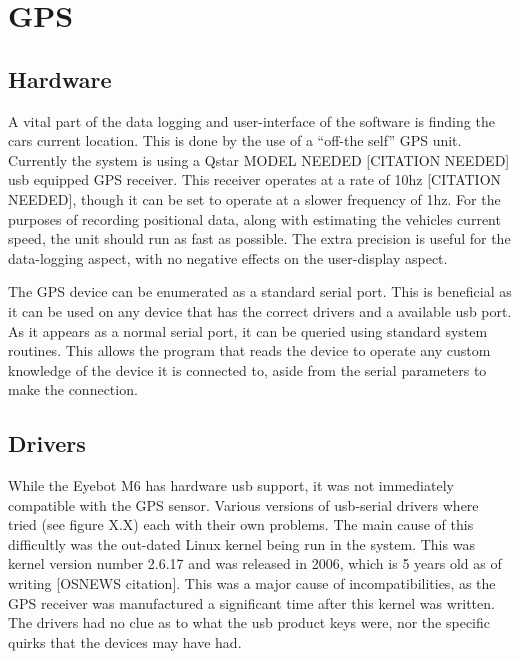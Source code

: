 

\section{GPS}

\subsection{Hardware}

A vital part of the data logging and user-interface of the software is finding the cars current location. This is done by the use of a “off-the self” GPS unit. Currently the system is using a Qstar MODEL NEEDED [CITATION NEEDED] usb equipped GPS receiver. This receiver operates at a rate of 10hz [CITATION NEEDED], though it can be set to operate at a slower frequency of 1hz. For the purposes of recording positional data, along with estimating the vehicles current speed, the unit should run as fast as possible. The extra precision is useful for the data-logging aspect, with no negative effects on the user-display aspect.  

The GPS device can be enumerated as a standard serial port. This is beneficial as it can be used on any device that has the correct drivers and a available usb port. As it appears as a normal serial port, it can be queried using standard system routines. This allows the program that reads the device to operate any custom knowledge of the device it is connected to, aside from the serial parameters to make the connection. 

\subsection{ Drivers}

While the Eyebot M6 has hardware usb support, it was not immediately compatible with the GPS sensor. Various versions of usb-serial drivers where tried (see figure X.X) each with their own problems. The main cause of this difficultly was the out-dated Linux kernel being run in the system. This was kernel version number 2.6.17 and was released in 2006, which is 5 years old as of writing [OSNEWS citation]. This was a major cause of incompatibilities, as the GPS receiver was manufactured a significant time after this kernel was written. The drivers had no clue as to what the usb product keys were, nor the specific quirks that the devices may have had.

